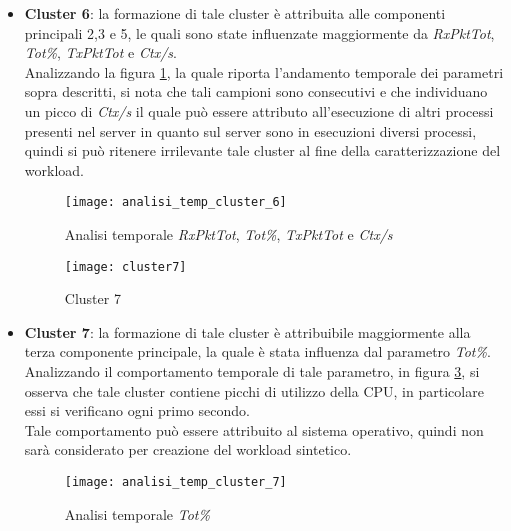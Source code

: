 \begin{itemize}
  \item \textbf{Cluster 6}: la formazione di tale cluster è attribuita alle
  componenti principali 2,3 e 5, le quali sono state influenzate maggiormente
  da \textit{RxPktTot}, \textit{Tot\%}, \textit{TxPktTot} e \textit{Ctx/s}.\\
  Analizzando la figura \ref{analisi_temp_cluster_6}, la quale riporta l'andamento
  temporale dei parametri sopra descritti, si nota che tali campioni sono consecutivi
  e che individuano un picco di \textit{Ctx/s} il quale può essere attributo all'esecuzione
  di altri processi presenti nel server in quanto sul server sono in esecuzioni
  diversi processi, quindi si può ritenere irrilevante tale cluster al fine
  della caratterizzazione del workload.\\

  \begin{figure}[!htbp]
    \centering
    \texttt{[image: analisi\_temp\_cluster\_6]}
    \caption{Analisi temporale \textit{RxPktTot}, \textit{Tot\%}, \textit{TxPktTot} e \textit{Ctx/s}}
    \label{analisi_temp_cluster_6}
  \end{figure}

  \clearpage

  \begin{figure}[!htbp]
    \centering
    \texttt{[image: cluster7]}
    \caption{Cluster 7}
    \label{cluster7}
  \end{figure}

  \item \textbf{Cluster 7}: la formazione di tale cluster è attribuibile maggiormente
  alla terza componente principale, la quale è stata influenza dal parametro \textit{Tot\%}.
  Analizzando il comportamento temporale di tale parametro, in figura \ref{analisi_temp_cluster_7},
  si osserva che tale cluster contiene picchi di utilizzo della CPU, in particolare
  essi si verificano ogni primo secondo.\\
  Tale comportamento può essere attribuito al sistema operativo, quindi non sarà
  considerato per creazione del workload sintetico.

  \begin{figure}[!htbp]
    \centering
    \texttt{[image: analisi\_temp\_cluster\_7]}
    \caption{Analisi temporale \textit{Tot\%}}
    \label{analisi_temp_cluster_7}
  \end{figure}

  \clearpage


\end{itemize}
